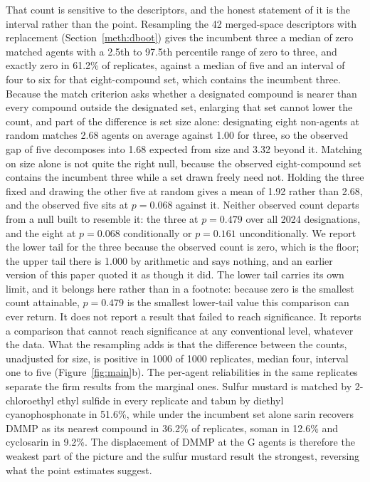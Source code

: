 \documentclass[1p,times]{elsarticle}
\begin{document}
That count is sensitive to the descriptors, and the honest statement of it is
the interval rather than the point. Resampling the 42 merged-space descriptors
with replacement (Section~\ref{meth:dboot}) gives the incumbent three a median
of zero matched agents with a 2.5th to 97.5th percentile range of zero to
three, and exactly zero
in 61.2\% of replicates, against a median of five and an interval of four to six
for that eight-compound set, which contains the incumbent three. Because the
match criterion asks whether a designated compound is nearer than every
compound outside the designated set, enlarging that set cannot lower the count,
and part of the difference is set size alone: designating eight non-agents at
random matches 2.68 agents on average against 1.00 for three, so the observed
gap of five decomposes into 1.68 expected from size and 3.32 beyond it. Matching
on size alone is not quite the right null, because the observed eight-compound
set contains the incumbent three while a set drawn freely need not. Holding the
three fixed and drawing the other five at random gives a mean of 1.92 rather
than 2.68, and the observed five sits at $p=0.068$ against it. Neither observed
count departs from a null built to resemble it: the three at $p=0.479$ over all
2024 designations, and the eight at $p=0.068$ conditionally or $p=0.161$
unconditionally. We report the lower tail for the three because the observed
count is zero, which is the floor; the upper tail there is 1.000 by arithmetic
and says nothing, and an earlier version of this paper quoted it as though it
did. The lower tail carries its own limit, and it belongs here rather than in a
footnote: because zero is the smallest count attainable, $p=0.479$ is the
smallest lower-tail value this comparison can ever return. It does not report a
result that failed to reach significance. It reports a comparison that cannot
reach significance at any conventional level, whatever the data. What the resampling adds is that the
difference between the counts, unadjusted for size, is positive in 1000 of 1000 replicates, median
four, interval one to five (Figure~\ref{fig:main}b). The per-agent reliabilities
in the same replicates separate the firm results from the marginal ones. Sulfur
mustard is matched by 2-chloroethyl ethyl sulfide in every replicate and tabun by
diethyl cyanophosphonate in 51.6\%, while under the incumbent set alone sarin
recovers DMMP as its nearest compound in 36.2\% of replicates, soman in 12.6\%
and cyclosarin in 9.2\%. The displacement of DMMP at the G agents is therefore
the weakest part of the picture and the sulfur mustard result the strongest,
reversing what the point estimates suggest.
\end{document}
